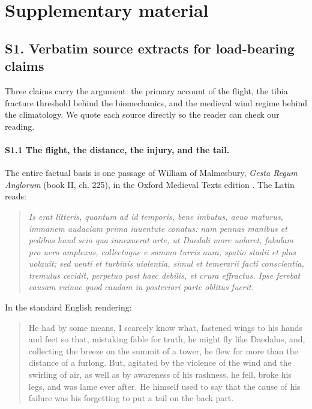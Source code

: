 \clearpage
\setcounter{figure}{0}
\setcounter{table}{0}
\renewcommand{\thefigure}{S\arabic{figure}}
\renewcommand{\thetable}{S\arabic{table}}
\section*{Supplementary material}

\subsection*{S1. Verbatim source extracts for load-bearing claims}

Three claims carry the argument: the primary account of the flight, the tibia
fracture threshold behind the biomechanics, and the medieval wind regime behind the
climatology. We quote each source directly so the reader can check our reading.

\paragraph{S1.1 The flight, the distance, the injury, and the tail.}
The entire factual basis is one passage of William of Malmesbury, \textit{Gesta
Regum Anglorum} (book II, ch. 225), in the Oxford Medieval Texts edition
\autocite{williamMalmesbury_gesta}. The Latin reads:

\begin{quote}\small\itshape
Is erat litteris, quantum ad id temporis, bene imbutus, aeuo maturus, immanem
audaciam prima iuuentute conatus: nam pennas manibus et pedibus haud scio qua
innexuerat arte, ut Daedali more uolaret, fabulam pro uero amplexus, collectaque e
summo turris aura, spatio stadii et plus uolauit; sed uenti et turbinis uiolentia,
simul et temerarii facti conscientia, tremulus cecidit, perpetuo post haec debilis,
et crura effractus. Ipse ferebat causam ruinae quod caudam in posteriori parte
oblitus fuerit.
\end{quote}

\noindent In the standard English rendering:

\begin{quote}\small
He had by some means, I scarcely know what, fastened wings to his hands and feet so
that, mistaking fable for truth, he might fly like Daedalus, and, collecting the
breeze on the summit of a tower, he flew for more than the distance of a furlong.
But, agitated by the violence of the wind and the swirling of air, as well as by
awareness of his rashness, he fell, broke his legs, and was lame ever after. He
himself used to say that the cause of his failure was his forgetting to put a tail
on the back part.
\end{quote}

